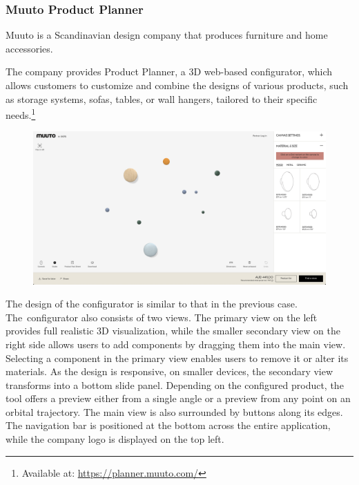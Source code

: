 \subsubsection{Muuto Product Planner}

Muuto is a Scandinavian design company that produces furniture and home accessories. \cite{Muuto}

The company provides Product Planner, a 3D web-based configurator, which allows customers to customize and combine the designs of various products, such as storage systems, sofas, tables, or wall hangers, tailored to their specific needs.\footnote{Available at: \url{https://planner.muuto.com/}}~\cite{MuutoPlanner}

\begin{figure}[h]
\centering
\includegraphics[width=\textwidth]{images/analysis_muuto-product-planner.png}
\end{figure}

The design of the configurator is similar to that in the previous case. The~configurator also consists of two views. The primary view on the left provides full realistic 3D visualization, while the smaller secondary view on the right side allows users to add components by dragging them into the main view. Selecting a component in the primary view enables users to remove it or alter its materials. As the design is responsive, on smaller devices, the secondary view transforms into a bottom slide panel. Depending on the configured product, the tool offers a preview either from a single angle or a preview from any point on an orbital trajectory. The main view is also surrounded by buttons along its edges. The navigation bar is positioned at the bottom across the entire application, while the company logo is displayed on the top left.

